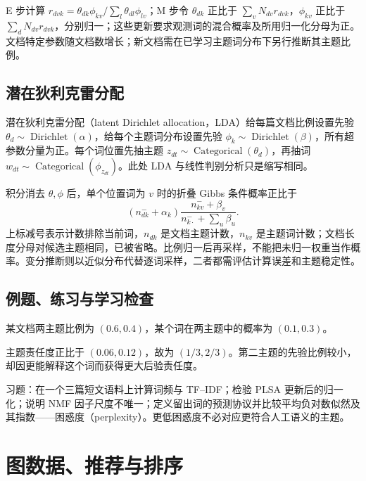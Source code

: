 \documentclass[UTF8,12pt,a4paper,fontset=fandol]{ctexbook}
\begin{document}
E 步计算 $r_{dvk}=\theta_{dk}\phi_{kv}/\sum_l\theta_{dl}\phi_{lv}$；M 步令 $\theta_{dk}$ 正比于 $\sum_vN_{dv}r_{dvk}$，$\phi_{kv}$ 正比于 $\sum_dN_{dv}r_{dvk}$，分别归一；这些更新要求观测词的混合概率及所用归一化分母为正。文档特定参数随文档数增长；新文档需在已学习主题词分布下另行推断其主题比例。

\section{潜在狄利克雷分配}

潜在狄利克雷分配（latent Dirichlet allocation，LDA）给每篇文档比例设置先验 $\theta_d\sim\operatorname{Dirichlet}(\alpha)$，给每个主题词分布设置先验 $\phi_k\sim\operatorname{Dirichlet}(\beta)$，所有超参数分量为正。每个词位置先抽主题 $z_{dt}\sim\operatorname{Categorical}(\theta_d)$，再抽词 $w_{dt}\sim\operatorname{Categorical}(\phi_{z_{dt}})$。此处 LDA 与线性判别分析只是缩写相同。

积分消去 $\theta,\phi$ 后，单个位置词为 $v$ 时的折叠 Gibbs 条件概率正比于
\[
 (n_{dk}^{-}+\alpha_k)
 \frac{n_{kv}^{-}+\beta_v}{n_{k\cdot}^{-}+\sum_u\beta_u}.
\]
上标减号表示计数排除当前词，$n_{dk}$ 是文档主题计数，$n_{kv}$ 是主题词计数；文档长度分母对候选主题相同，已被省略。比例归一后再采样，不能把未归一权重当作概率。变分推断则以近似分布代替逐词采样，二者都需评估计算误差和主题稳定性。

\section{例题、练习与学习检查}

\begin{example}[一次主题后验计算]
某文档两主题比例为 $(0.6,0.4)$，某个词在两主题中的概率为 $(0.1,0.3)$。
\end{example}
\begin{solve}
主题责任度正比于 $(0.06,0.12)$，故为 $(1/3,2/3)$。第二主题的先验比例较小，却因更能解释这个词而获得更大后验责任度。
\end{solve}

习题：在一个三篇短文语料上计算词频与 TF--IDF；检验 PLSA 更新后的归一化；说明 NMF 因子尺度不唯一；定义留出词的预测协议并比较平均负对数似然及其指数——困惑度（perplexity）。更低困惑度不必对应更符合人工语义的主题。

\chapter{图数据、推荐与排序}
\label{chap:ml-graphs}
\end{document}
